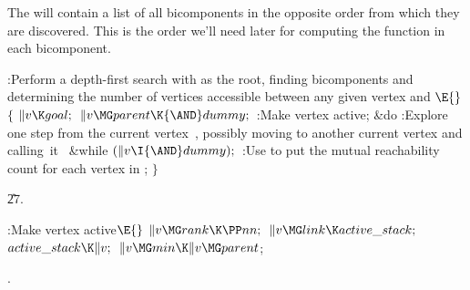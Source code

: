 The  will contain a list of all bicomponents in
the opposite order from which they are discovered. This is the order
we'll need later for computing the  function in each bicomponent.

\Y\B\4:Perform a depth-first search with  as the root, finding
bicomponents and determining the number of vertices accessible between any
given vertex and \X${}\E{}$\6
${}\{{}$\1\6
${}\|v\K\\{goal};{}$\6
${}\|v\MG\\{parent}\K{\AND}\\{dummy};{}$\6
:Make vertex  active\X;\6
\&{do}\5
:Explore one step from the current vertex~, possibly moving to
another current vertex and calling~it~\X\5
\&{while} ${}(\|v\I{\AND}\\{dummy});{}$\6
:Use  to put the mutual reachability count for each
vertex  in \X;\6
\4${}\}{}$\2\par
\U27.\fi

\B{}:Make vertex  active\X${}\E{}$\6
$\|v\MG\\{rank}\K\PP\\{nn};{}$\6
${}\|v\MG\\{link}\K\\{active\_stack};{}$\6
${}\\{active\_stack}\K\|v;{}$\6
${}\|v\MG\\{min}\K\|v\MG\\{parent}{}$;\par
{}.\fi

